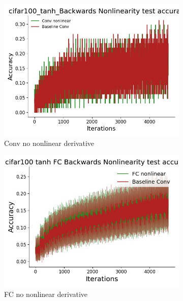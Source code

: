 \begin{figure}[htb]
\medskip
\begin{subfigure}{0.25\textwidth}
  \includegraphics[width=\linewidth]{chapter_6_figures/AR/cifar100_tanh_Backwards_Nonlinearity_test_accuracies_prelim_1.jpg}
  \caption{Conv no nonlinear derivative}
\end{subfigure}\hfil %
\begin{subfigure}{0.25\textwidth}
  \includegraphics[width=\linewidth]{chapter_6_figures/AR/cifar100_tanh_FC_Backwards_Nonlinearity_test_accuracies_prelim_1.jpg}
  \caption{FC no nonlinear derivative}
\end{subfigure}\hfil %
\begin{subfigure}{0.25\textwidth}

\end{subfigure}
\end{figure}
